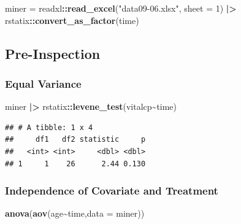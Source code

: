 \documentclass[
]{ctexart}
\newenvironment{Shaded}{\begin{snugshade}}{\end{snugshade}}
\newcommand{\AttributeTok}[1]{\textcolor[rgb]{0.13,0.29,0.53}{#1}}
\newcommand{\DecValTok}[1]{\textcolor[rgb]{0.00,0.00,0.81}{#1}}
\newcommand{\FunctionTok}[1]{\textcolor[rgb]{0.13,0.29,0.53}{\textbf{#1}}}
\newcommand{\NormalTok}[1]{#1}
\newcommand{\OtherTok}[1]{\textcolor[rgb]{0.56,0.35,0.01}{#1}}
\newcommand{\SpecialCharTok}[1]{\textcolor[rgb]{0.81,0.36,0.00}{\textbf{#1}}}
\newcommand{\StringTok}[1]{\textcolor[rgb]{0.31,0.60,0.02}{#1}}
\begin{document}
\begin{Shaded}
\begin{Highlighting}[]
\NormalTok{miner }\OtherTok{=}\NormalTok{ readxl}\SpecialCharTok{::}\FunctionTok{read\_excel}\NormalTok{(}\StringTok{"data09{-}06.xlsx"}\NormalTok{, }\AttributeTok{sheet =} \DecValTok{1}\NormalTok{) }\SpecialCharTok{|\textgreater{}} 
\NormalTok{  rstatix}\SpecialCharTok{::}\FunctionTok{convert\_as\_factor}\NormalTok{(time)}
\end{Highlighting}
\end{Shaded}

\hypertarget{pre-inspection}{%
\subsection{Pre-Inspection}\label{pre-inspection}}

\hypertarget{equal-variance}{%
\subsubsection{Equal Variance}\label{equal-variance}}

\begin{Shaded}
\begin{Highlighting}[]
\NormalTok{miner }\SpecialCharTok{|\textgreater{}} 
\NormalTok{  rstatix}\SpecialCharTok{::}\FunctionTok{levene\_test}\NormalTok{(vitalcp}\SpecialCharTok{\textasciitilde{}}\NormalTok{time)}
\end{Highlighting}
\end{Shaded}

\begin{verbatim}
## # A tibble: 1 x 4
##     df1   df2 statistic     p
##   <int> <int>     <dbl> <dbl>
## 1     1    26      2.44 0.130
\end{verbatim}

\hypertarget{independence-of-covariate-and-treatment}{%
\subsubsection{Independence of Covariate and
Treatment}\label{independence-of-covariate-and-treatment}}

\begin{Shaded}
\begin{Highlighting}[]
\FunctionTok{anova}\NormalTok{(}\FunctionTok{aov}\NormalTok{(age}\SpecialCharTok{\textasciitilde{}}\NormalTok{time,}\AttributeTok{data =}\NormalTok{ miner))}
\end{Highlighting}
\end{Shaded}
\end{document}
